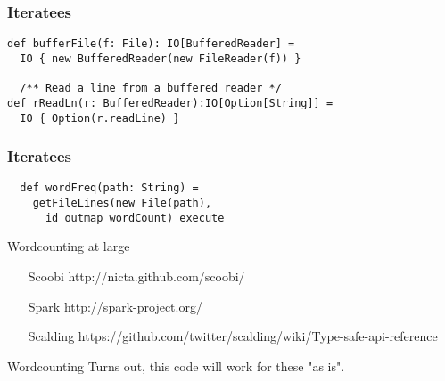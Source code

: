 \documentclass{beamer}
\begin{document}
\begin{frame}[fragile]
\frametitle{Iteratees}
\begin{lstlisting}
def bufferFile(f: File): IO[BufferedReader] =
  IO { new BufferedReader(new FileReader(f)) }

  /** Read a line from a buffered reader */
def rReadLn(r: BufferedReader):IO[Option[String]] =
  IO { Option(r.readLine) }
\end{lstlisting}
\end{frame}

\begin{frame}[fragile]
\frametitle{Iteratees}
\begin{lstlisting}
  def wordFreq(path: String) =
    getFileLines(new File(path),
      id outmap wordCount) execute
\end{lstlisting}
\end{frame}

\begin{frame}{Wordcounting at large}
\begin{enumerate}
  \item[Scoobi] http://nicta.github.com/scoobi/
  \item[Spark] http://spark-project.org/
  \item[Scalding] https://github.com/twitter/scalding/wiki/Type-safe-api-reference
\end{enumerate}
\end{frame}

\begin{frame}{Wordcounting}
  Turns out, this code will work for these "as is".
\end{frame}
\end{document}
